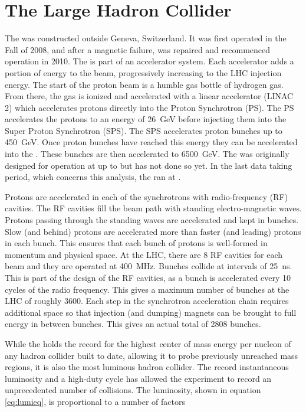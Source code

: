 \section{The Large Hadron Collider}
The \LHC was constructed outside Geneva, Switzerland.  It was first operated in the Fall of 2008, and after a magnetic failure, was repaired and recommenced operation in 2010. The \LHC is part of an accelerator system.  Each accelerator adds a portion of energy to the beam, progressively increasing to the LHC injection energy.  The start of the \LHC proton beam is a humble gas bottle of hydrogen gas.  From there, the gas is ionized and accelerated with a linear accelerator (LINAC 2) which accelerates protons directly into the Proton Synchrotron (PS).  The PS accelerates the protons to an energy of \SI{26}{\GeV} before injecting them into the Super Proton Synchrotron (SPS).  The SPS accelerates proton bunches up to \SI{450}{\GeV}.  Once proton bunches have reached this energy they can be accelerated into the \LHC. These bunches are then accelerated to \SI{6500}{\GeV}.  The \LHC was originally designed for operation at up to \rootsfourteen but has not done so yet. In the last data taking period, which concerns this analysis, the \LHC ran at \rootsthirteen.

Protons are accelerated in each of the synchrotrons with radio-frequency (RF) cavities.  The RF cavities fill the beam path with standing electro-magnetic waves. Protons passing through the standing waves are accelerated and kept in bunches. Slow (and behind) protons are accelerated more than faster (and leading) protons in each bunch. This ensures that each bunch of protons is well-formed in momentum and physical space. At the LHC, there are 8 RF cavities for each beam and they are operated at \SI{400}{MHz}. Bunches collide at intervals of \SI{25}{ns}.  This is part of the design of the RF cavities, as a bunch is accelerated every 10 cycles of the radio frequency. This gives a maximum number of bunches at the LHC of roughly 3600. Each step in the synchrotron acceleration chain requires additional space so that injection (and dumping) magnets can be brought to full energy in between bunches. This gives an actual total of 2808 bunches.

While the \LHC holds the record for the highest center of mass energy per nucleon of any hadron collider built to date, allowing it to probe previously unreached mass regions, it is also the most luminous hadron collider.  The record instantaneous luminosity and a high-duty cycle has allowed the \CMS experiment to record an unprecedented number of collisions.  The luminosity, shown in equation \ref{eq:lumieq}, is proportional to a number of factors

